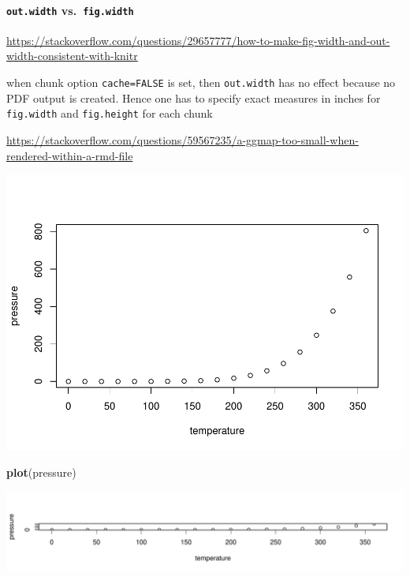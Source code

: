 \documentclass[
]{book}
\newenvironment{Shaded}{\begin{snugshade}}{\end{snugshade}}
\newcommand{\FunctionTok}[1]{\textcolor[rgb]{0.13,0.29,0.53}{\textbf{#1}}}
\newcommand{\NormalTok}[1]{#1}
\theoremstyle{definition}
\theoremstyle{definition}
\theoremstyle{definition}
\theoremstyle{definition}
\theoremstyle{remark}
\begin{document}
\hypertarget{out.width-vs.-fig.width}{%
\paragraph{\texorpdfstring{\texttt{out.width} vs.~\texttt{fig.width}}{out.width vs.~fig.width}}\label{out.width-vs.-fig.width}}

\url{https://stackoverflow.com/questions/29657777/how-to-make-fig-width-and-out-width-consistent-with-knitr}

when chunk option \texttt{cache=FALSE} is set, then \texttt{out.width} has no effect because no PDF output is created. Hence one has to specify exact measures in inches for \texttt{fig.width} and \texttt{fig.height} for each chunk

\url{https://stackoverflow.com/questions/59567235/a-ggmap-too-small-when-rendered-within-a-rmd-file}

\begin{center}\includegraphics[width=1\linewidth]{202401280001-test_files/figure-latex/unnamed-chunk-10-1} \end{center}

\begin{Shaded}
\begin{Highlighting}[]
\FunctionTok{plot}\NormalTok{(pressure)}
\end{Highlighting}
\end{Shaded}

\includegraphics{202401280001-test_files/figure-latex/unnamed-chunk-11-1.pdf}
\end{document}
